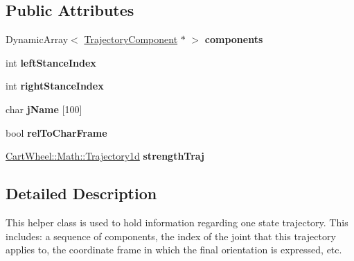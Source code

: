 \subsection*{Public Attributes}
\begin{DoxyCompactItemize}
\item 
\hypertarget{classCartWheel_1_1Core_1_1Trajectory_a352fc2a1034b23b9e2026056a84dd2b0}{
DynamicArray$<$ \hyperlink{classCartWheel_1_1Core_1_1TrajectoryComponent}{TrajectoryComponent} $\ast$ $>$ {\bfseries components}}
\label{classCartWheel_1_1Core_1_1Trajectory_a352fc2a1034b23b9e2026056a84dd2b0}

\item 
\hypertarget{classCartWheel_1_1Core_1_1Trajectory_a522c10bf7e21de628c7bd78bfec07504}{
int {\bfseries leftStanceIndex}}
\label{classCartWheel_1_1Core_1_1Trajectory_a522c10bf7e21de628c7bd78bfec07504}

\item 
\hypertarget{classCartWheel_1_1Core_1_1Trajectory_a7fac7553d8ff55e950a1082ae62d30bc}{
int {\bfseries rightStanceIndex}}
\label{classCartWheel_1_1Core_1_1Trajectory_a7fac7553d8ff55e950a1082ae62d30bc}

\item 
\hypertarget{classCartWheel_1_1Core_1_1Trajectory_aafd3a09d3ca88f6167b844c33698dc8d}{
char {\bfseries jName} \mbox{[}100\mbox{]}}
\label{classCartWheel_1_1Core_1_1Trajectory_aafd3a09d3ca88f6167b844c33698dc8d}

\item 
\hypertarget{classCartWheel_1_1Core_1_1Trajectory_ae5bb4a83a3cac5c09ccfaf1c2346185d}{
bool {\bfseries relToCharFrame}}
\label{classCartWheel_1_1Core_1_1Trajectory_ae5bb4a83a3cac5c09ccfaf1c2346185d}

\item 
\hypertarget{classCartWheel_1_1Core_1_1Trajectory_ac98e82b7ade20cc3c578d281860dda11}{
\hyperlink{classCartWheel_1_1Math_1_1GenericTrajectory}{CartWheel::Math::Trajectory1d} {\bfseries strengthTraj}}
\label{classCartWheel_1_1Core_1_1Trajectory_ac98e82b7ade20cc3c578d281860dda11}

\end{DoxyCompactItemize}


\subsection{Detailed Description}
This helper class is used to hold information regarding one state trajectory. This includes: a sequence of components, the index of the joint that this trajectory applies to, the coordinate frame in which the final orientation is expressed, etc. 

